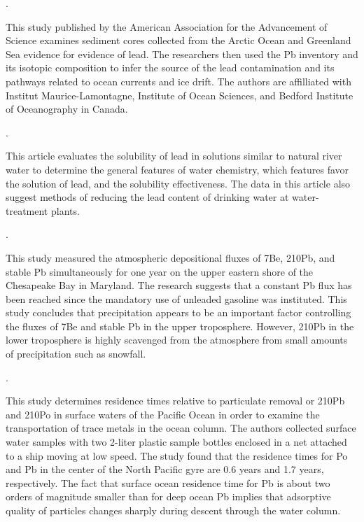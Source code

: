 \documentclass{article}\usepackage[]{graphicx}\usepackage[]{color}
\begin{document}
\noindent {} .


This study published by the American Association for the Advancement of Science examines sediment cores collected from the Arctic Ocean and Greenland Sea evidence for evidence of lead. The researchers then used the Pb inventory and its isotopic composition to infer the source of the lead contamination and its pathways related to ocean currents and ice drift. The authors are affilliated with Institut Maurice-Lamontagne, Institute of Ocean Sciences, and Bedford Institute of Oceanography in Canada.


\noindent {} .


This article evaluates the solubility of lead in solutions similar to natural river water to determine the general features of water chemistry, which features favor the solution of lead, and the solubility effectiveness. The data in this article also suggest methods of reducing the lead content of drinking water at water-treatment plants. 


\noindent {} .


This study measured the atmospheric depositional fluxes of 7Be, 210Pb, and stable Pb simultaneously for one year on the upper eastern shore of the Chesapeake Bay in Maryland. The research suggests that a constant Pb flux has been reached since the mandatory use of unleaded gasoline was instituted. This study concludes that precipitation appears to be an important factor controlling the fluxes of 7Be and stable Pb in the upper troposphere. However, 210Pb in the lower troposphere is highly scavenged from the atmosphere from small amounts of precipitation such as snowfall. 


\noindent {} .


This study determines residence times relative to particulate removal or 210Pb and 210Po in surface waters of the Pacific Ocean in order to examine the transportation of trace metals in the ocean column. The authors collected surface water samples with two 2-liter plastic sample bottles enclosed in a net attached to a ship moving at low speed. The study found that the residence times for Po and Pb in the center of the North Pacific gyre are 0.6 years and 1.7 years, respectively. The fact that surface ocean residence time for Pb is about two orders of magnitude smaller than for deep ocean Pb implies that adsorptive quality of particles changes sharply during descent through the water column.
\end{document}
